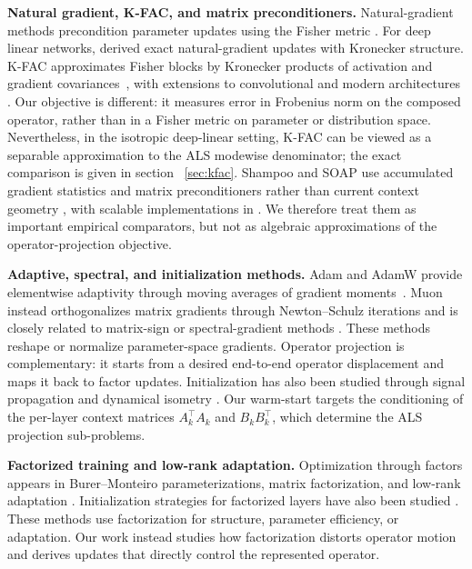 \documentclass{article}
\begin{document}
\textbf{Natural gradient, K-FAC, and matrix preconditioners.}
Natural-gradient methods precondition parameter updates using the Fisher metric
\citep{amari1998natural,martens2020new}. For deep linear networks,
\citet{bernacchia2018exact} derived exact natural-gradient updates with
Kronecker structure. K-FAC approximates Fisher blocks by Kronecker products of
activation and gradient covariances~\citep{martens2015optimizing}, with
extensions to convolutional and modern architectures
\citep{grosse2016kronecker,george2018ekfac,eschenhagen2023kfac}. Our objective
is different: it measures error in Frobenius norm on the composed operator,
rather than in a Fisher metric on parameter or distribution space. Nevertheless,
in the isotropic deep-linear setting, K-FAC can be viewed as a separable
approximation to the ALS modewise denominator; the exact comparison is given in section ~\ref{sec:kfac}. 
Shampoo and SOAP use accumulated gradient
statistics and matrix preconditioners rather than current context geometry
\citep{gupta2018shampoo,vyas2024soap}, with scalable implementations in
\citet{anil2021scalable,morwani2024shampoo}. We therefore treat them as
important empirical comparators, but not as algebraic approximations of the
operator-projection objective.

\textbf{Adaptive, spectral, and initialization methods.}
Adam and AdamW provide elementwise adaptivity through moving averages of
gradient moments~\citep{kingma2015adam,loshchilov2019decoupled}. Muon instead
orthogonalizes matrix gradients through Newton--Schulz iterations and is
closely related to matrix-sign or spectral-gradient methods
\citep{jordan2024muon,bernstein2024modular,kosson2024spectral,
kim2026muon,newtonmuon2026,liu2025muon}. These methods reshape or normalize
parameter-space gradients. Operator projection is complementary: it starts from
a desired end-to-end operator displacement and maps it back to factor updates.
Initialization has also been studied through signal propagation and dynamical
isometry
\citep{schoenholz2017deep,pennington2017resurrecting,pennington2018emergence}.
Our warm-start targets the conditioning of the per-layer context matrices
$A_k^\top A_k$ and $B_k B_k^\top$, which determine the ALS projection
sub-problems.

\textbf{Factorized training and low-rank adaptation.}
Optimization through factors appears in Burer--Monteiro parameterizations,
matrix factorization, and low-rank adaptation
\citep{burer2003nonlinear,hu2022lora,zhao2024galore,hayou2024lora}.
Initialization strategies for factorized layers have also been studied
\citep{khodak2021factorized}. These methods use factorization for structure,
parameter efficiency, or adaptation. Our work instead studies how factorization
distorts operator motion and derives updates that directly control the
represented operator.
\end{document}
